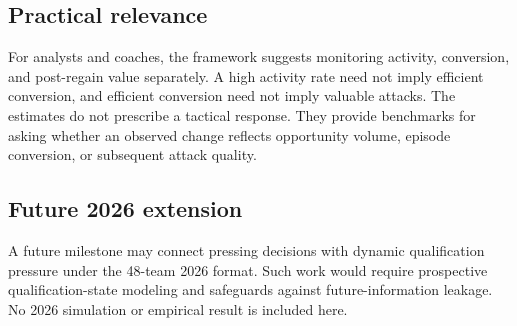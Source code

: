 \subsection{Practical relevance}
For analysts and coaches, the framework suggests monitoring activity, conversion, and post-regain value separately. A high activity rate need not imply efficient conversion, and efficient conversion need not imply valuable attacks. The estimates do not prescribe a tactical response. They provide benchmarks for asking whether an observed change reflects opportunity volume, episode conversion, or subsequent attack quality.

\subsection{Future 2026 extension}
A future milestone may connect pressing decisions with dynamic qualification pressure under the 48-team 2026 format. Such work would require prospective qualification-state modeling and safeguards against future-information leakage. No 2026 simulation or empirical result is included here.
